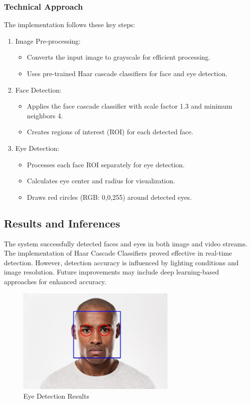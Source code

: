 \documentclass[12pt,a4paper]{article}
\begin{document}
\subsubsection{Technical Approach}
The implementation follows these key steps:
\begin{enumerate}
  \item Image Pre-processing:
    \begin{itemize}
      \item Converts the input image to grayscale for efficient processing.
      \item Uses pre-trained Haar cascade classifiers for face and eye detection.
    \end{itemize}

  \item Face Detection:
    \begin{itemize}
      \item Applies the face cascade classifier with scale factor 1.3 and minimum neighbors 4.
      \item Creates regions of interest (ROI) for each detected face.
    \end{itemize}

  \item Eye Detection:
    \begin{itemize}
      \item Processes each face ROI separately for eye detection.
      \item Calculates eye center and radius for visualization.
      \item Draws red circles (RGB: 0,0,255) around detected eyes.
    \end{itemize}
\end{enumerate}

\subsection{Results and Inferences}
The system successfully detected faces and eyes in both image and video streams. The implementation of Haar Cascade Classifiers proved effective in real-time detection. However, detection accuracy is influenced by lighting conditions and image resolution. Future improvements may include deep learning-based approaches for enhanced accuracy.

\begin{figure}[H]
  \centering
  \includegraphics[width=0.7\textwidth]{eye_detection/eye_detection_result.jpg}
  \caption{Eye Detection Results}
  \label{fig:eye_detection}
\end{figure}
\end{document}
